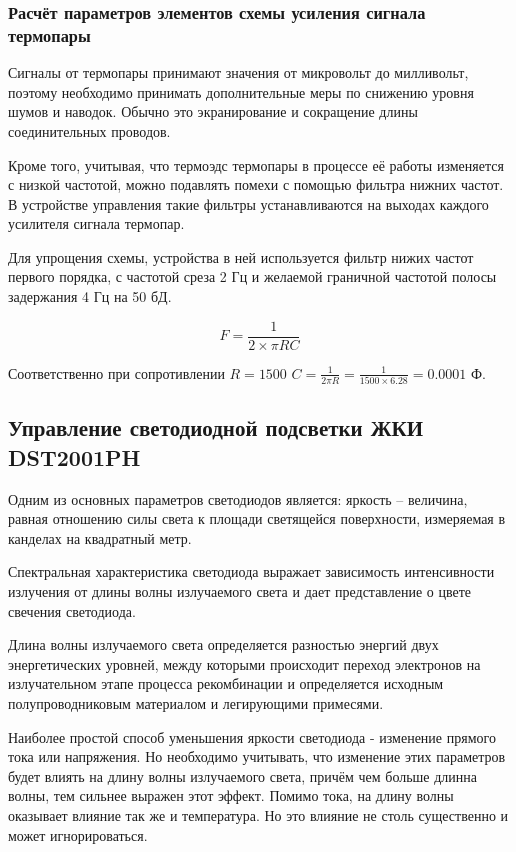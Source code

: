 \subsubsection{Расчёт параметров элементов схемы усиления сигнала термопары}
Сигналы от термопары принимают значения от микровольт до милливольт, поэтому необходимо принимать
дополнительные меры по снижению уровня шумов и наводок.
Обычно это экранирование и сокращение длины соединительных проводов.

Кроме того, учитывая, что термоэдс термопары в процессе её работы изменяется
с низкой частотой, можно подавлять помехи с помощью
фильтра нижних частот. В устройстве управления такие фильтры устанавливаются на выходах
каждого усилителя сигнала термопар.

Для упрощения схемы, устройства в ней используется фильтр нижих частот первого порядка, с
частотой среза 2 Гц и желаемой граничной частотой полосы задержания 4 Гц на 50 бД.

\begin{equation}
	F = \frac{1} {2 \times{} \pi{} RC}
\end{equation}

Соответственно при сопротивлении  $R = 1500$
$C = \frac{1}{2\pi{}R} = \frac{1}{1500 \times{} 6.28} = 0.0001$ Ф.

\subsection{Управление светодиодной подсветки ЖКИ DST2001PH}
Одним из основных параметров светодиодов является: яркость -- величина,
равная отношению силы света к площади светящейся
поверхности, измеряемая в канделах на квадратный метр.

Спектральная характеристика светодиода выражает зависимость интенсивности
излучения от длины волны излучаемого света и дает представление о цвете
свечения светодиода.


Длина волны излучаемого света определяется разностью
энергий двух энергетических уровней, между которыми происходит переход
электронов на излучательном этапе процесса рекомбинации и определяется
исходным полупроводниковым материалом и легирующими примесями.

Наиболее простой способ уменьшения яркости светодиода - изменение прямого
тока или напряжения. Но необходимо учитывать, что изменение этих параметров будет
влиять на длину волны излучаемого света, причём чем больше длинна волны, тем сильнее
выражен этот эффект. Помимо тока, на длину волны оказывает влияние так же и температура.
Но это влияние не столь существенно и может игнорироваться.


